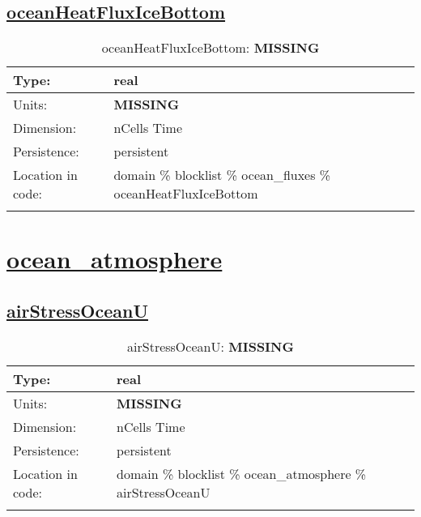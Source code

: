 \subsection[oceanHeatFluxIceBottom]{\hyperref[sec:var_tab_ocean_fluxes]{oceanHeatFluxIceBottom}}
\label{subsec:var_sec_ocean_fluxes_oceanHeatFluxIceBottom}
\begin{center}
\begin{longtable}{| p{2.0in} | p{4.0in} |}
        \hline 
        Type: & real \\
        \hline 
        Units: & {\bf \color{red} MISSING} \\
        \hline 
        Dimension: & nCells Time \\
        \hline 
        Persistence: & persistent \\
        \hline 
         Location in code: & domain \% blocklist \% ocean\_fluxes \% oceanHeatFluxIceBottom \\
         \hline 
    \caption{oceanHeatFluxIceBottom: {\bf \color{red} MISSING}}
\end{longtable}
\end{center}
\section[ocean\_atmosphere]{\hyperref[sec:var_tab_ocean_atmosphere]{ocean\_atmosphere}}
\label{sec:var_sec_ocean_atmosphere}
\subsection[airStressOceanU]{\hyperref[sec:var_tab_ocean_atmosphere]{airStressOceanU}}
\label{subsec:var_sec_ocean_atmosphere_airStressOceanU}
\begin{center}
\begin{longtable}{| p{2.0in} | p{4.0in} |}
        \hline 
        Type: & real \\
        \hline 
        Units: & {\bf \color{red} MISSING} \\
        \hline 
        Dimension: & nCells Time \\
        \hline 
        Persistence: & persistent \\
        \hline 
         Location in code: & domain \% blocklist \% ocean\_atmosphere \% airStressOceanU \\
         \hline 
    \caption{airStressOceanU: {\bf \color{red} MISSING}}
\end{longtable}
\end{center}

